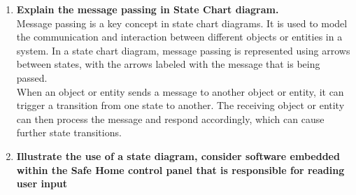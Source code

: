 \documentclass[11pt]{article}
\begin{document}
\begin{enumerate}
	\item \textbf{Explain the message passing in State Chart diagram.}\\
	Message passing is a key concept in state chart diagrams. It is used to model the communication and interaction between different objects or entities in a system. In a state chart diagram, message passing is represented using arrows between states, with the arrows labeled with the message that is being passed.\\

	When an object or entity sends a message to another object or entity, it can trigger a transition from one state to another. The receiving object or entity can then process the message and respond accordingly, which can cause further state transitions.
	
	
	\item \textbf{Illustrate the use of a state diagram, consider software embedded within the Safe Home control panel that is responsible for reading user input}\\

\end{enumerate}
\end{document}
